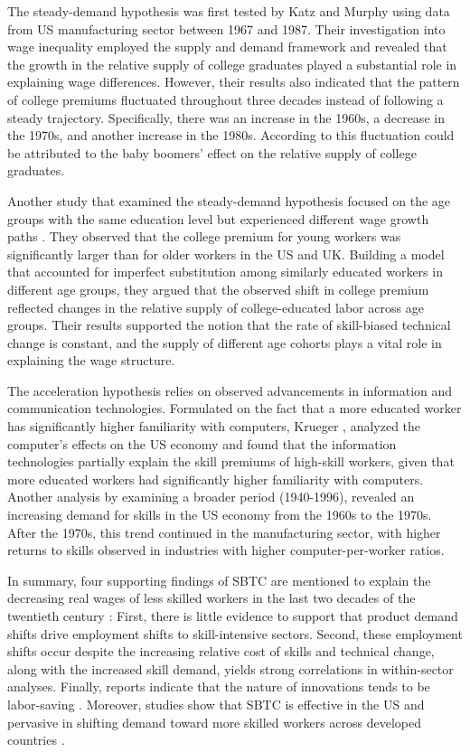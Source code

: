 \begin{onehalfspace}
The steady-demand hypothesis was first tested by Katz and Murphy \citeyearpar{1992Katz}
using data from US manufacturing sector between 1967 and 1987. Their
investigation into wage inequality employed the supply and demand
framework and revealed that the growth in the relative supply of college
graduates played a substantial role in explaining wage differences.
However, their results also indicated that the pattern of college
premiums fluctuated throughout three decades instead of following
a steady trajectory. Specifically, there was an increase in the 1960s,
a decrease in the 1970s, and another increase in the 1980s. According
to \citet[KM hereafter]{1992Katz} this fluctuation could be attributed
to the baby boomers' effect on the relative supply of college graduates.

Another study that examined the steady-demand hypothesis focused on
the age groups with the same education level but experienced different
wage growth paths \citep{2001Card}. They observed that the college
premium for young workers was significantly larger than for older
workers in the US and UK. Building a model that accounted for imperfect
substitution among similarly educated workers in different age groups,
they argued that the observed shift in college premium reflected changes
in the relative supply of college-educated labor across age groups.
Their results supported the notion that the rate of skill-biased technical
change is constant, and the supply of different age cohorts plays
a vital role in explaining the wage structure.

The acceleration hypothesis relies on observed advancements in information
and communication technologies. Formulated on the fact that a more
educated worker has significantly higher familiarity with computers,
Krueger \citeyearpar{1993Krueger}, analyzed the computer's effects
on the US economy and found that the information technologies partially
explain the skill premiums of high-skill workers, given that more
educated workers had significantly higher familiarity with computers.
Another analysis by \citet{1998Autor} examining a broader period
(1940-1996), revealed an increasing demand for skills in the US economy
from the 1960s to the 1970s. After the 1970s, this trend continued
in the manufacturing sector, with higher returns to skills observed
in industries with higher computer-per-worker ratios.

In summary, four supporting findings of SBTC are mentioned to explain
the decreasing real wages of less skilled workers in the last two
decades of the twentieth century \citep{1992Bound,1992Katz,1998Berman,1998Machin}:
First, there is little evidence to support that product demand shifts
drive employment shifts to skill-intensive sectors. Second, these
employment shifts occur despite the increasing relative cost of skills
and technical change, along with the increased skill demand, yields
strong correlations in within-sector analyses. Finally, reports indicate
that the nature of innovations tends to be labor-saving \citep{1987Mark}.
Moreover, studies show that SBTC is effective in the US and pervasive
in shifting demand toward more skilled workers across developed countries
\citep{1998Berman}.


\end{onehalfspace}
